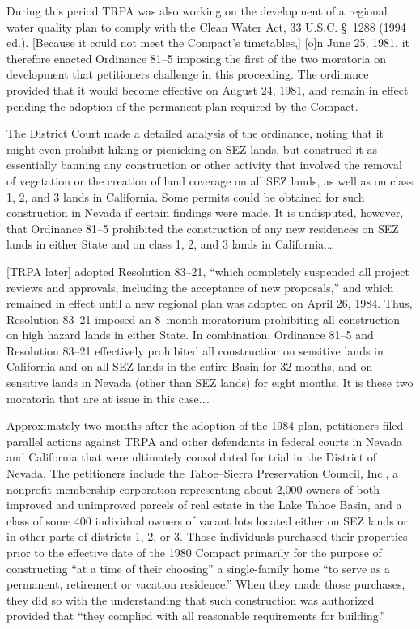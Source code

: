 During this period TRPA was also working on the development of a regional water
quality plan to comply with the Clean Water Act, 33 U.S.C. \S~1288 (1994 ed.).
[Because it could not meet the Compact's timetables,] [o]n June 25, 1981, it
therefore enacted Ordinance 81--5 imposing the first of the two moratoria on
development that petitioners challenge in this proceeding. The ordinance
provided that it would become effective on August 24, 1981, and remain in effect
pending the adoption of the permanent plan required by the Compact. 

The District Court made a detailed analysis of the ordinance, noting that it
might even prohibit hiking or picnicking on SEZ lands, but construed it as
essentially banning any construction or other activity that involved the removal
of vegetation or the creation of land coverage on all SEZ lands, as well as on
class 1, 2, and 3 lands in California. Some permits could be obtained for such
construction in Nevada if certain findings were made. It is undisputed, however,
that Ordinance 81--5 prohibited the construction of any new residences on SEZ
lands in either State and on class 1, 2, and 3 lands in California.\ldots

[TRPA later] adopted Resolution 83--21, ``which completely suspended all project
reviews and approvals, including the acceptance of new proposals,'' and which
remained in effect until a new regional plan was adopted on April 26, 1984.
Thus, Resolution 83--21 imposed an 8--month moratorium prohibiting all
construction on high hazard lands in either State. In combination, Ordinance
81--5 and Resolution 83--21 effectively prohibited all construction on sensitive
lands in California and on all SEZ lands in the entire Basin for 32 months, and
on sensitive lands in Nevada (other than SEZ lands) for eight months. It is
these two moratoria that are at issue in this case.\ldots



Approximately two months after the adoption of the 1984 plan, petitioners filed
parallel actions against TRPA and other defendants in federal courts in Nevada
and California that were ultimately consolidated for trial in the District of
Nevada. The petitioners include the Tahoe--Sierra Preservation Council, Inc., a
nonprofit membership corporation representing about 2,000 owners of both
improved and unimproved parcels of real estate in the Lake Tahoe Basin, and a
class of some 400 individual owners of vacant lots located either on SEZ lands
or in other parts of districts 1, 2, or 3. Those individuals purchased their
properties prior to the effective date of the 1980 Compact primarily for the
purpose of constructing ``at a time of their choosing'' a single-family home
``to serve as a permanent, retirement or vacation residence.'' When they made
those purchases, they did so with the understanding that such construction was
authorized provided that ``they complied with all reasonable requirements for
building.''

